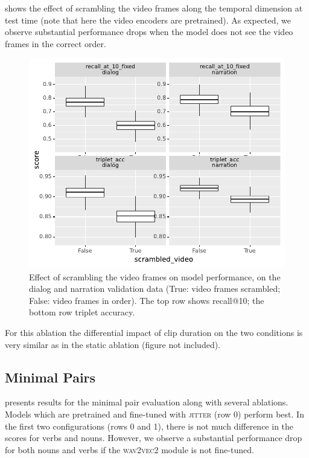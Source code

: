  shows the effect of scrambling the video frames 
along the temporal dimension at test time (note that here the video encoders 
are pretrained). As expected, we observe substantial 
performance drops when the model does not see the video frames in 
the correct order. 
\begin{figure}[htb]
	\centering
	\includegraphics[width=\columnwidth]{results/ablations/scrambled_video.pdf}
	\caption{Effect of scrambling the video frames on model performance, on the 
	dialog and narration validation data (True: video frames scrambled;
        False: video frames in order). The top row shows recall@10;
		the bottom row triplet accuracy.}
	\label{fig:scrambled_video}
      \end{figure}
For this ablation the differential impact of clip duration on
the two conditions is very similar as in the {\sc static}
ablation (figure not included).

\subsection{Minimal Pairs}
\label{sec:minimal-pairs}


 presents results for the minimal pair 
evaluation along with several ablations. Models which are 
pretrained and fine-tuned with \textsc{jitter} (row 0) perform best. In the 
first two configurations (rows 0 and 1), there is not much difference in the scores for 
verbs and nouns. However, we observe a substantial performance drop for both nouns and verbs if 
the \textsc{wav2vec2} module is not fine-tuned.

